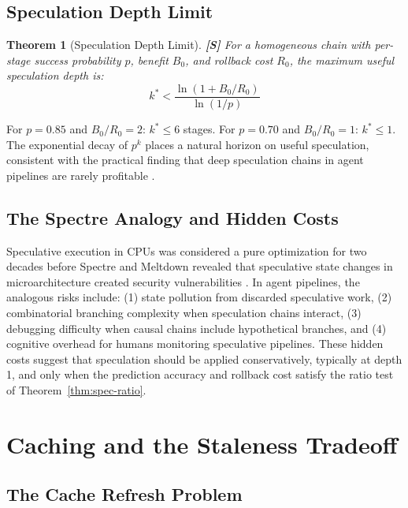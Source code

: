 \documentclass[11pt,a4paper]{article}
\newtheorem{theorem}{Theorem}[section]
\theoremstyle{definition}
\theoremstyle{remark}
\begin{document}
\subsection{Speculation Depth Limit}

\begin{theorem}[Speculation Depth Limit]\label{thm:depth}
\textbf{[S]} For a homogeneous chain with per-stage success probability $p$, benefit $B_0$, and rollback cost $R_0$, the maximum useful speculation depth is:
\[
    k^* < \frac{\ln(1 + B_0/R_0)}{\ln(1/p)}
\]
\end{theorem}

For $p = 0.85$ and $B_0/R_0 = 2$: $k^* \leq 6$ stages. For $p = 0.70$ and $B_0/R_0 = 1$: $k^* \leq 1$. The exponential decay of $p^k$ places a natural horizon on useful speculation, consistent with the practical finding that deep speculation chains in agent pipelines are rarely profitable \citep{zhou2025speculative}.

\subsection{The Spectre Analogy and Hidden Costs}

Speculative execution in CPUs was considered a pure optimization for two decades before Spectre and Meltdown revealed that speculative state changes in microarchitecture created security vulnerabilities \citep{spectre2018}. In agent pipelines, the analogous risks include: (1) state pollution from discarded speculative work, (2) combinatorial branching complexity when speculation chains interact, (3) debugging difficulty when causal chains include hypothetical branches, and (4) cognitive overhead for humans monitoring speculative pipelines. These hidden costs suggest that speculation should be applied conservatively, typically at depth 1, and only when the prediction accuracy and rollback cost satisfy the ratio test of Theorem~\ref{thm:spec-ratio}.


\section{Caching and the Staleness Tradeoff}\label{sec:caching}

\subsection{The Cache Refresh Problem}
\end{document}
